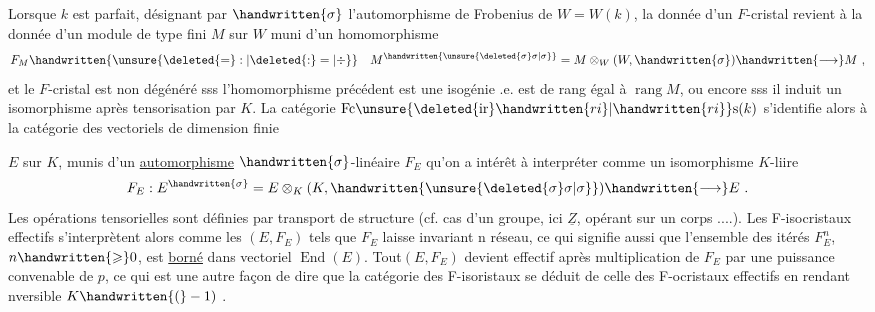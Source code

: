  Lorsque $k$ est parfait, désignant par $\handwritten{\sigma}$ l'automorphisme de Frobenius de $W=W(k)$, la donnée d'un $F$-cristal revient à la donnée d'un module de type fini $M$ sur $W$ muni d'un homomorphisme
\[
F_M\handwritten{\unsure{\deleted{=}:|\deleted{:}=|\div}}\quad M^{\handwritten{\unsure{\deleted{\sigma}\sigma|\sigma}}}=M\otimes_W(W,\handwritten{\sigma})\handwritten{\longrightarrow}M\ ,
\]
et le $F$-cristal est non dégénéré sss l'homomorphisme précédent est une isogénie .e. est de rang égal à $\operatorname{rang}M$, ou encore sss il induit un isomorphisme après tensorisation par $K$. La catégorie  $\mathrm{Fc}\unsure{\deleted{\mathrm{ir}}\handwritten{ri}|\handwritten{ri}}\mathrm{s}(k)$ s'identifie alors à la catégorie des vectoriels de dimension finie

$E$ sur $K$, munis d'un  \uline{automorphisme} $\handwritten{\sigma}$-linéaire $F_E$\handwritten{;}  qu'on a intérêt à interpréter comme un isomorphisme $K$-liire
\[
F_E : E^{\handwritten{\sigma}} = E\otimes_K(K,\handwritten{\unsure{\deleted{\sigma}\sigma|\sigma}})\handwritten{\longrightarrow} E\ .
\]
Les opérations tensorielles sont définies par transport de structure (cf. cas d'un groupe, ici $\underline{Z}$, opérant sur un corps ....). Les F-isocristaux effectifs s'interprètent alors comme les $(E,F_E)$ tels que $F_E$ laisse invariant n réseau, ce qui signifie aussi que l'ensemble des itérés $F_E^n$, $n\handwritten{\geqslant}0$, est \uline{borné} dans  vectoriel $\operatorname{End}(E)$. Tout$(E,F_E)$ devient  effectif après multiplication de $F_E$ par une puissance convenable de $p$, ce qui est une autre façon de dire que la catégorie des F-isoristaux se déduit de celle des F-ocristaux effectifs  en rendant nversible $K\handwritten{(}-1)$ .

